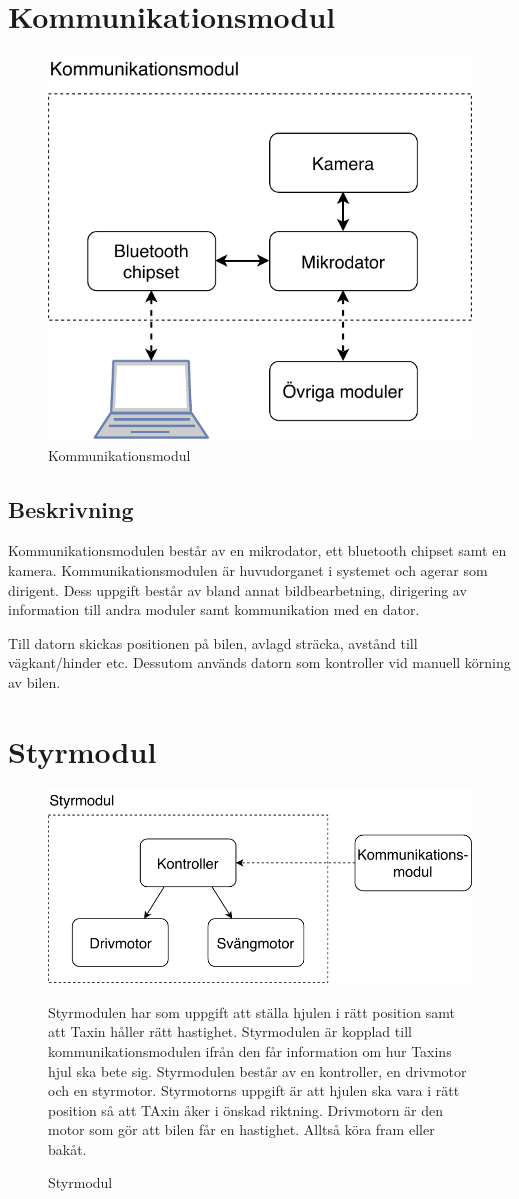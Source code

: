 \documentclass[kravspec/krav.tex]{subfiles}
\begin{document}
\clearpage
\section{Kommunikationsmodul}
\begin{figure}[H]
    \centering
    \includegraphics[width=0.6\linewidth]{kravspec/figures/kommunikationsmodul.pdf}
    \caption{Kommunikationsmodul}
    \label{fig:kommunikationsmodul}
\end{figure}
\subsection{Beskrivning}
Kommunikationsmodulen består av en mikrodator, ett bluetooth chipset samt en
kamera. Kommunikationsmodulen är huvudorganet i systemet och agerar som
dirigent. Dess uppgift består av bland annat bildbearbetning, dirigering av
information till andra moduler samt kommunikation med en dator.

Till datorn skickas positionen på bilen, avlagd sträcka, avstånd till
vägkant/hinder etc. Dessutom används datorn som kontroller vid manuell körning
av bilen.

\clearpage
\section{Styrmodul}
\begin{figure}[h]
    \centering
    \includegraphics[width=0.6\linewidth]{kravspec/figures/styrmodul.pdf}
    \caption{Styrmodul}
Styrmodulen har som uppgift att ställa hjulen i rätt position samt att Taxin håller rätt hastighet. Styrmodulen är kopplad till kommunikationsmodulen ifrån den får information om hur Taxins hjul ska bete sig. Styrmodulen består av en kontroller, en drivmotor och en styrmotor. Styrmotorns uppgift är att hjulen ska vara i rätt position så att TAxin åker i önskad riktning. Drivmotorn är den motor som gör att bilen får en hastighet. Alltså köra fram eller bakåt.
    \label{fig:styrmodul}
\end{figure}
\end{document}
